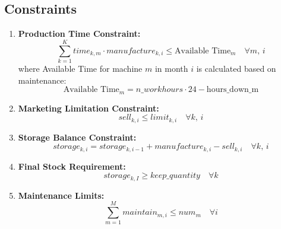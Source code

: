 \documentclass{article}
\begin{document}
\subsection*{Constraints}

\begin{enumerate}
    \item \textbf{Production Time Constraint:}
    \[
    \sum_{k=1}^{K} time_{k,m} \cdot manufacture_{k,i} \leq \text{Available Time}_m \quad \forall m, \, i
    \]
    where Available Time for machine $m$ in month $i$ is calculated based on maintenance:
    \[
    \text{Available Time}_m = n\_workhours \cdot 24 - \text{hours\_down\_m}
    \]

    \item \textbf{Marketing Limitation Constraint:}
    \[
    sell_{k,i} \leq limit_{k,i} \quad \forall k, \, i
    \]

    \item \textbf{Storage Balance Constraint:}
    \[
    storage_{k,i} = storage_{k,i-1} + manufacture_{k,i} - sell_{k,i} \quad \forall k, \, i
    \]

    \item \textbf{Final Stock Requirement:}
    \[
    storage_{k,I} \geq keep\_quantity \quad \forall k
    \]

    \item \textbf{Maintenance Limits:}
    \[
    \sum_{m=1}^{M} maintain_{m,i} \leq num_m \quad \forall i
    \]
\end{enumerate}
\end{document}
